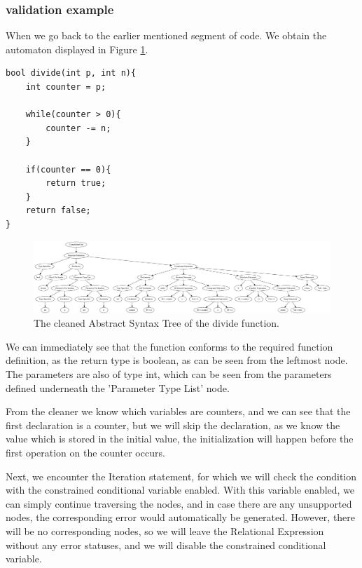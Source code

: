 \documentclass[12pt]{article}
\begin{document}
\subsubsection{validation example}
When we go back to the earlier mentioned segment of code. We obtain the automaton displayed in Figure \ref{fig:divide_cleaned}.

\begin{lstlisting}[style=CStyle]
bool divide(int p, int n){
	int counter = p;
	
	while(counter > 0){
		counter -= n;
	}
	
	if(counter == 0){
		return true;
	}
	return false;
}
\end{lstlisting}

\begin{figure}[h]
	\centering
	\includegraphics[width=\linewidth]{divide_cleaned}
	\caption{The cleaned Abstract Syntax Tree of the divide function.}
	\label{fig:divide_cleaned}
\end{figure}

We can immediately see that the function conforms to the required function definition, as the return type is boolean, as can be seen from the leftmost node. The parameters are also of type int, which can be seen from the parameters defined underneath the 'Parameter Type List' node.

From the cleaner we know which variables are counters, and we can see that the first declaration is a counter, but we will skip the declaration, as we know the value which is stored in the initial value, the initialization will happen before the first operation on the counter occurs. 

Next, we encounter the Iteration statement, for which we will check the condition with the constrained conditional variable enabled. With this variable enabled, we can simply continue traversing the nodes, and in case there are any unsupported nodes, the corresponding error would automatically be generated. However, there will be no corresponding nodes, so we will leave the Relational Expression without any error statuses, and we will disable the constrained conditional variable. 
\end{document}
